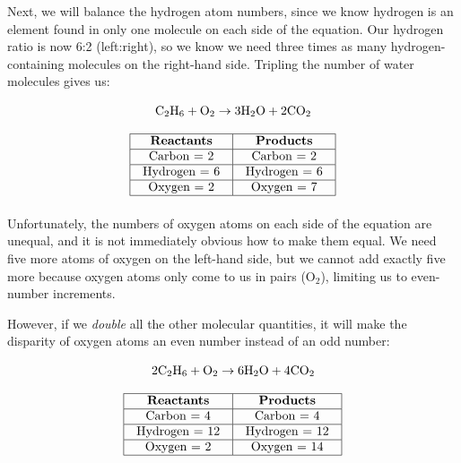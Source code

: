\filbreak

Next, we will balance the hydrogen atom numbers, since we know hydrogen is an element found in only one molecule on each side of the equation.  Our hydrogen ratio is now 6:2 (left:right), so we know we need three times as many hydrogen-containing molecules on the right-hand side.  Tripling the number of water molecules gives us:

$$\hbox{C}_2\hbox{H}_6 + \hbox{O}_2 \to \hbox{3H}_2\hbox{O} + \hbox{2CO}_2$$


$$\vbox{\offinterlineskip
\halign{\strut
\vrule \quad\hfil # \ \hfil & 
\vrule \quad\hfil # \ \hfil \vrule \cr
\noalign{\hrule}
%
\textbf{Reactants} & \textbf{Products} \cr
%
\noalign{\hrule}
%
Carbon = 2 & Carbon = 2 \cr
%
\noalign{\hrule}
%
Hydrogen = 6 & Hydrogen = 6 \cr
%
\noalign{\hrule}
%
Oxygen = 2 & Oxygen = 7 \cr
%
\noalign{\hrule}
} %
}$$ %

\vskip 10pt

Unfortunately, the numbers of oxygen atoms on each side of the equation are unequal, and it is not immediately obvious how to make them equal.  We need five more atoms of oxygen on the left-hand side, but we cannot add exactly five more because oxygen atoms only come to us in pairs (O$_{2}$), limiting us to even-number increments.  

\filbreak

However, if we \textit{double} all the other molecular quantities, it will make the disparity of oxygen atoms an even number instead of an odd number:

$$\hbox{2C}_2\hbox{H}_6 + \hbox{O}_2 \to \hbox{6H}_2\hbox{O} + \hbox{4CO}_2$$


$$\vbox{\offinterlineskip
\halign{\strut
\vrule \quad\hfil # \ \hfil & 
\vrule \quad\hfil # \ \hfil \vrule \cr
\noalign{\hrule}
%
\textbf{Reactants} & \textbf{Products} \cr
%
\noalign{\hrule}
%
Carbon = 4 & Carbon = 4 \cr
%
\noalign{\hrule}
%
Hydrogen = 12 & Hydrogen = 12 \cr
%
\noalign{\hrule}
%
Oxygen = 2 & Oxygen = 14 \cr
%
\noalign{\hrule}
} %
}$$ %

